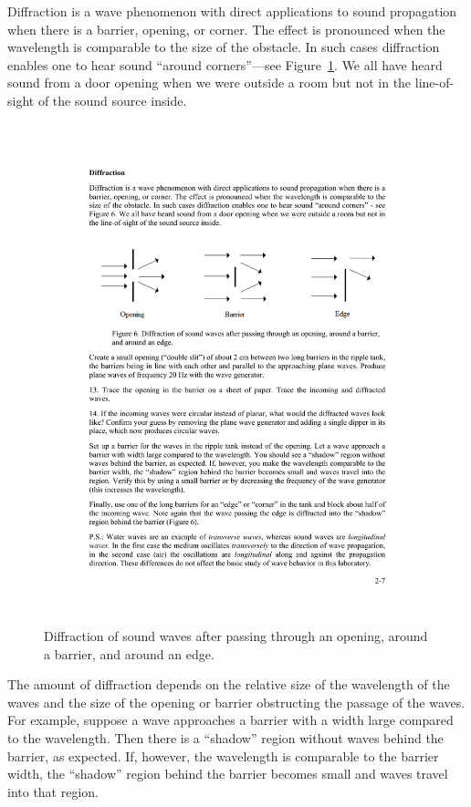 \documentclass[11pt]{NSF}
\begin{document}
Diffraction is a wave phenomenon with direct applications to sound propagation
when there is a barrier, opening, or corner. The effect is pronounced when the
wavelength is comparable to the size of the obstacle. In such cases diffraction
enables one to hear sound ``around corners”---see Figure~\ref{f:7}. 
We all have heard
sound from a door opening when we were outside a room but not in the
line-of-sight of the sound source inside.
%
\begin{figure}[hbtp]
\begin{center}
\includegraphics[width=.95\textwidth]{fig2_7}
\caption{Diffraction of sound waves after passing through an opening, 
around a barrier, and around an edge.}
\label{f:7}
\end{center}
\end{figure}
%

The amount of diffraction depends on the relative size of the wavelength
of the waves and the size of the opening or barrier obstructing the 
passage of the waves.
For example, suppose a wave approaches a barrier with a width large
compared to the wavelength.
Then there is a ``shadow” region without waves behind the barrier, 
as expected. 
If, however, the wavelength is comparable to the barrier width, the 
``shadow” region behind the barrier becomes small and waves travel into 
that region.
\end{document}
